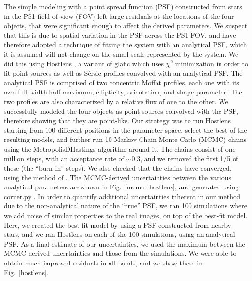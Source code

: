 \documentclass[manuscript]{aastex}
\begin{document}
The simple modeling with a point spread function (PSF) constructed from stars in the PS1 field of view (FOV) left large residuals at the locations of the four objects, that were significant enough to affect the derived parameters. We suspect that this is due to spatial variation in the PSF across the PS1 FOV, and have therefore adopted a technique of fitting the system with an analytical PSF, which it is assumed will not change on the small scale represented by the system. We did this using Hostlens \citep{rus16}, a variant of glafic \citep{ogu10b} which uses $\chi^2$ minimization in order to fit point sources as well as S{\'e}rsic \citep{ser63} profiles convolved with an analytical PSF. The analytical PSF is comprised of two concentric Moffat \citep{mof69} profiles, each one with its own full-width half maximum, ellipticity, orientation, and shape parameter. The two profiles are also characterized by a relative flux of one to the other. We successfully modeled the four objects as point sources convolved with the PSF, therefore showing that they are point-like. Our strategy was to run Hostlens starting from 100 different positions in the parameter space, select the best of the resulting models, and further run 10 Markov Chain Monte Carlo (MCMC) chains using the MetropolisÐHastings algorithm around it. The chains consist of one million steps, with an acceptance rate of $\sim0.3$, and we removed the first 1/5 of these (the ``burn-in'' steps). We also checked that the chains have converged, using the method of \citet{gel95}. The MCMC-derived uncertainties between the various analytical parameters are shown in Fig.~\ref{mcmc_hostlens}, and generated using corner.py \citep{for16}. In order to quantify additional uncertainties inherent in our method due to the non-analytical nature of the ``true'' PSF, we ran 100 simulations where we add noise of similar properties to the real images, on top of the best-fit model. Here, we created the best-fit model by using a PSF constructed from nearby stars, and we ran Hostlens on each of the 100 simulations, using an analytical PSF. As a final estimate of our uncertainties, we used the maximum between the MCMC-derived uncertainties and those from the simulations. We were able to obtain much improved residuals in all bands, and we show these in Fig.~\ref{hostlens}. 
 
\end{document}
